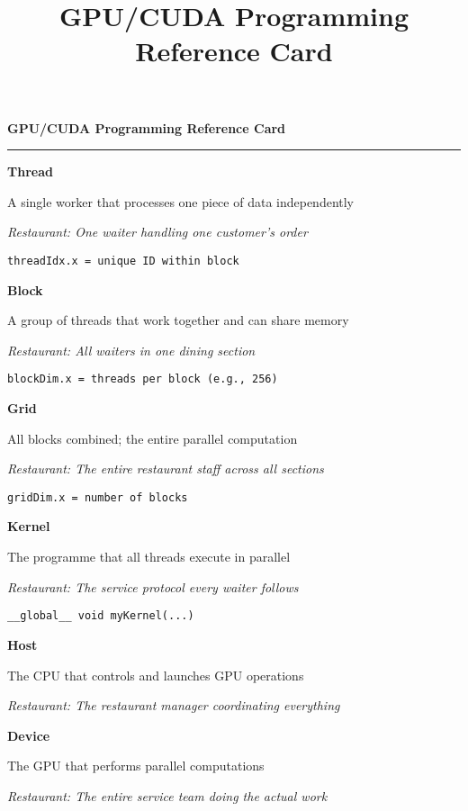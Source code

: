 \documentclass[10pt, a4paper]{article}
\title{GPU/CUDA Programming Reference Card}
\author{}
\date{}
\newcommand{\term}[1]{\textcolor{termcolor}{\textbf{#1}}\par\vspace{1pt}}
\newcommand{\definition}[1]{\small #1\par\vspace{1pt}}
\newcommand{\analogy}[1]{\textcolor{analogycolor}{\textit{\footnotesize #1}}\par\vspace{1pt}}
\newcommand{\example}[1]{\textcolor{examplecolor}{\footnotesize\texttt{#1}}\par}
\newcommand{\sectionheader}[1]{%
    \vspace{4pt}%
    \noindent\colorbox{sectionbg}{%
        \makebox[\linewidth][c]{\textbf{\large #1}}%
    }%
    \vspace{4pt}%
}
\begin{document}
\begin{center}
    {\Large\textbf{GPU/CUDA Programming Reference Card}}
    \vspace{2pt}
    \hrule height 1.5pt
\end{center}

\vspace{6pt}

\sectionheader{Core Concepts}

\begin{multicols}{2}
\raggedcolumns

\begin{termblock}
\term{Thread}
\definition{A single worker that processes one piece of data independently}
\analogy{Restaurant: One waiter handling one customer's order}
\example{threadIdx.x = unique ID within block}
\end{termblock}

\begin{termblock}
\term{Block}
\definition{A group of threads that work together and can share memory}
\analogy{Restaurant: All waiters in one dining section}
\example{blockDim.x = threads per block (e.g., 256)}
\end{termblock}

\begin{termblock}
\term{Grid}
\definition{All blocks combined; the entire parallel computation}
\analogy{Restaurant: The entire restaurant staff across all sections}
\example{gridDim.x = number of blocks}
\end{termblock}

\begin{termblock}
\term{Kernel}
\definition{The programme that all threads execute in parallel}
\analogy{Restaurant: The service protocol every waiter follows}
\example{\_\_global\_\_ void myKernel(...)}
\end{termblock}

\begin{termblock}
\term{Host}
\definition{The CPU that controls and launches GPU operations}
\analogy{Restaurant: The restaurant manager coordinating everything}
\end{termblock}

\begin{termblock}
\term{Device}
\definition{The GPU that performs parallel computations}
\analogy{Restaurant: The entire service team doing the actual work}
\end{termblock}

\columnbreak


\end{multicols}
\end{document}
